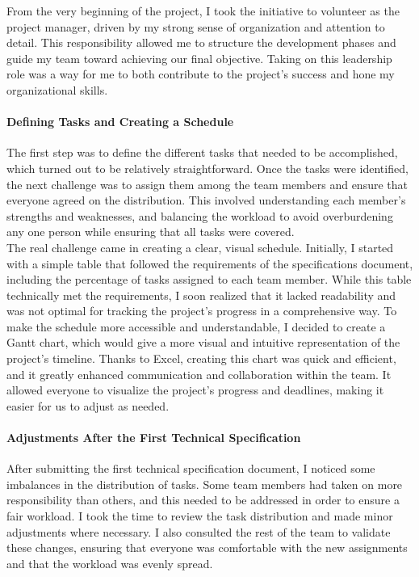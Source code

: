 \documentclass{article}
\begin{document}
From the very beginning of the project, I took the initiative to volunteer as the project manager, driven by my strong sense of organization and attention to detail. This responsibility allowed me to structure the development phases and guide my team toward achieving our final objective. Taking on this leadership role was a way for me to both contribute to the project’s success and hone my organizational skills.

\paragraph{Defining Tasks and Creating a Schedule}\hfill

The first step was to define the different tasks that needed to be accomplished, which turned out to be relatively straightforward. Once the tasks were identified, the next challenge was to assign them among the team members and ensure that everyone agreed on the distribution. This involved understanding each member's strengths and weaknesses, and balancing the workload to avoid overburdening any one person while ensuring that all tasks were covered.\\

The real challenge came in creating a clear, visual schedule. Initially, I started with a simple table that followed the requirements of the specifications document, including the percentage of tasks assigned to each team member. While this table technically met the requirements, I soon realized that it lacked readability and was not optimal for tracking the project's progress in a comprehensive way. To make the schedule more accessible and understandable, I decided to create a Gantt chart, which would give a more visual and intuitive representation of the project's timeline. Thanks to Excel, creating this chart was quick and efficient, and it greatly enhanced communication and collaboration within the team. It allowed everyone to visualize the project’s progress and deadlines, making it easier for us to adjust as needed.

\paragraph{Adjustments After the First Technical Specification}\hfill

After submitting the first technical specification document, I noticed some imbalances in the distribution of tasks. Some team members had taken on more responsibility than others, and this needed to be addressed in order to ensure a fair workload. I took the time to review the task distribution and made minor adjustments where necessary. I also consulted the rest of the team to validate these changes, ensuring that everyone was comfortable with the new assignments and that the workload was evenly spread.\\
\end{document}
